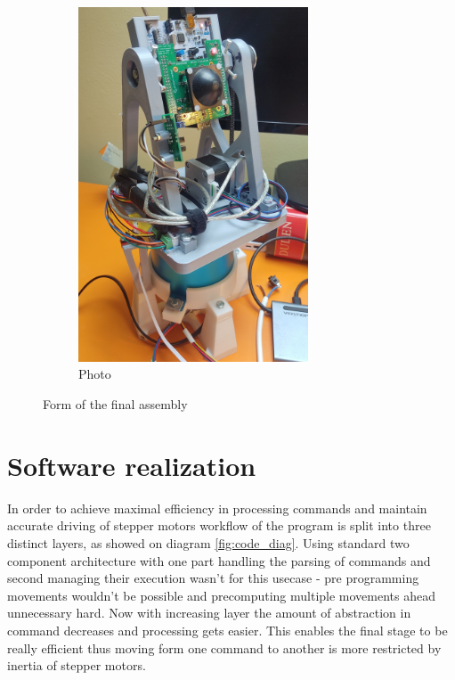 \begin{figure}[h!]
\begin{subfigure}[b]{0.45\textwidth}
        \includegraphics[width=0.75\textwidth]{../img/assembly_photo.jpg} %
        \caption{Photo}
    \end{subfigure}
    \caption{Form of the final assembly}
    \label{fig:side_by_side}
\end{figure}



\chapter{Software realization}

In order to achieve maximal efficiency in processing commands and  maintain accurate driving of stepper motors workflow of the program is split into three distinct layers, as showed on diagram \ref{fig:code_diag}.
Using standard two component architecture with one part handling the parsing of commands and second managing their execution wasn't for this usecase - pre programming movements wouldn't be possible and precomputing multiple movements ahead unnecessary hard.
Now with increasing layer the amount of abstraction in command decreases and processing gets easier.
This enables the final stage to be really efficient thus moving form one command to another is more restricted by inertia of stepper motors.


